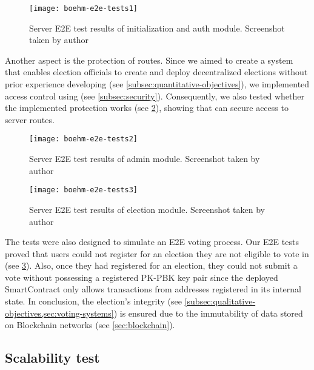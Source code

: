 \begin{figure}[H]
    \centering
    \texttt{[image: boehm-e2e-tests1]}
    \caption[Server E2E test results of initialization and auth module]{Server E2E test results of initialization and auth module. Screenshot taken by author}
    \label{fig:apx-e2e-tests-1}
\end{figure}

Another aspect is the protection of routes.
Since we aimed to create a system that enables election officials to create and deploy decentralized elections without prior experience developing  (see \cref{subsec:quantitative-objectives}), we implemented access control using  (see \cref{subsec:security}).
Consequently, we also tested whether the implemented protection works (see \cref{fig:apx-e2e-tests-2}), showing that  can secure access to server routes.

\begin{figure}[H]
    \centering
    \texttt{[image: boehm-e2e-tests2]}
    \caption[Server E2E test results of admin module]{Server E2E test results of admin module. Screenshot taken by author}
    \label{fig:apx-e2e-tests-2}
\end{figure}

\begin{figure}[H]
    \centering
    \texttt{[image: boehm-e2e-tests3]}
    \caption[Server E2E test results of election module]{Server E2E test results of election module. Screenshot taken by author}
    \label{fig:apx-e2e-tests-3}
\end{figure}

The tests were also designed to simulate an \gls{E2E} voting process.
Our \gls{E2E} tests proved that users could not register for an election they are not eligible to vote in (see \cref{fig:apx-e2e-tests-3}).
Also, once they had registered for an election, they could not submit a vote without possessing a registered \gls{PK}-\gls{PBK} key pair since the deployed \gls{SmartContract} only allows transactions from addresses registered in its internal state.
In conclusion, the election's integrity (see \cref{subsec:qualitative-objectives,sec:voting-systems}) is ensured due to the immutability of data stored on \gls{Blockchain} networks (see \cref{sec:blockchain}).

\subsection{Scalability test}\label{subsec:res-scalability-test}

